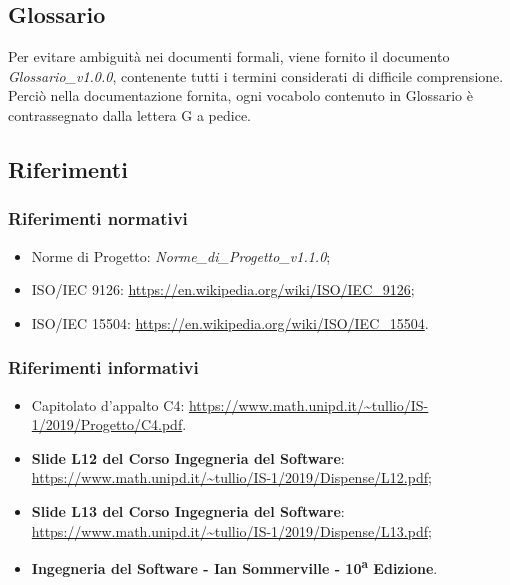 \subsection{Glossario}
Per evitare ambiguità nei documenti formali, viene fornito il documento \textit{Glossario\_v1.0.0},
contenente tutti i termini considerati di difficile comprensione. Perciò nella documentazione fornita, ogni vocabolo contenuto in Glossario è contrassegnato dalla lettera G a pedice.

\subsection{Riferimenti}
\subsubsection{Riferimenti normativi}
\begin{itemize}
	\item Norme di Progetto: \textit{Norme\_di\_Progetto\_v1.1.0};
	\item ISO/IEC 9126: \url{https://en.wikipedia.org/wiki/ISO/IEC_9126};
	\item ISO/IEC 15504: \url{https://en.wikipedia.org/wiki/ISO/IEC_15504}.
\end{itemize}
\subsubsection{Riferimenti informativi}
\begin{itemize}
	\item Capitolato d'appalto C4: \url{https://www.math.unipd.it/~tullio/IS-1/2019/Progetto/C4.pdf}.
	\item \textbf{Slide L12 del Corso Ingegneria del Software}:\\
	\url{https://www.math.unipd.it/~tullio/IS-1/2019/Dispense/L12.pdf};
	\item \textbf{Slide L13 del Corso Ingegneria del Software}:\\
	\url{https://www.math.unipd.it/~tullio/IS-1/2019/Dispense/L13.pdf};
	\item \textbf{Ingegneria del Software - Ian Sommerville - 10\textsuperscript{a} Edizione}.
\end{itemize}